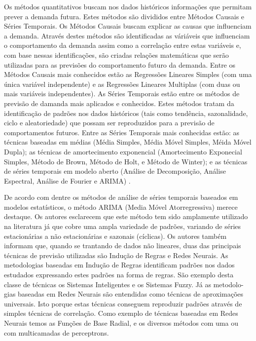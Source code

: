 \documentclass{book}
\begin{document}
Os métodos quantitativos buscam nos dados históricos informações que permitam prever a demanda futura. Estes métodos são divididos entre Métodos Causais e Séries Temporais. Os Métodos Causais buscam explicar as causas que influenciam a demanda. Através destes métodos são identificadas as váriáveis que influenciam o comportamento da demanda assim como a correlação entre estas variáveis e, com base nessas identificações, são criadas relações matemáticas que serão utilizadas para as previsões do comportamento futuro da demanda. Entre os Métodos Causais mais conhecidos estão as Regressões Lineares Simples (com uma única variável independente) e as Regressões Lineares Multiplas (com duas ou mais variáveis independentes). As Séries Temporais estão entre os métodos de
previsão de damanda mais aplicados e conhecidos. Estes métodos tratam da identificação de padrões nos dados históricos (tais como tendência, sazonalidade, ciclo e aleatoriedade) que possam ser reproduzidos para a previsão de comportamentos futuros. Entre as Séries Temporais mais conhecidas estão: as técnicas baseadas em médias (Média Simples, Média Móvel Simples, Méida Móvel Dupla); as técnicas de amortecimento exponencial (Amortecimento Exponecial Simples, Método de Brown, Método de Holt, e Método de Winter); e as técnicas de séries temporais
em modelo aberto (Análise de Decomposição, Análise Espectral, Análise de Fourier e ARIMA) \citep{WankeJulianelli2006}.

De acordo com \cite{RubioEtAl2011} dentre os métodos de análise de séries temporais baseados em modelos estatísticos, o método ARIMA (Media Móvel Atorregressiva) merece destaque. Os autores esclarecem que este método
tem sido amplamente utilizado na literatura já que cobre uma ampla variedade de padrões, variando de séries estacionárias a não estacionárias e sazonais (cíclicas). Os autores também informam que, quando se trantando de dados não lineares, duas das principais técnicas de previsão utilizadas são Indução de Regras e Redes Neurais. As metodologias baseadas em Indução de Regras identificam padrões nos dados estudados expressando estes padrões na forma de regras. São exemplo desta classe de técnicas os Sistemas Inteligentes e os Sistemas Fuzzy. Já as metodolo-
gias baseadas em Redes Neurais são entendidas como técnicas de aproximações universais. Isto porque estas técnicas conseguem reproduzir padrões através de simples técnicas de correlação. Como exemplo de técnicas baseadas em Redes
Neurais temos as Funções de Base Radial, e os diversos métodos com uma ou com
multicamadas de perceptrons.
\end{document}
